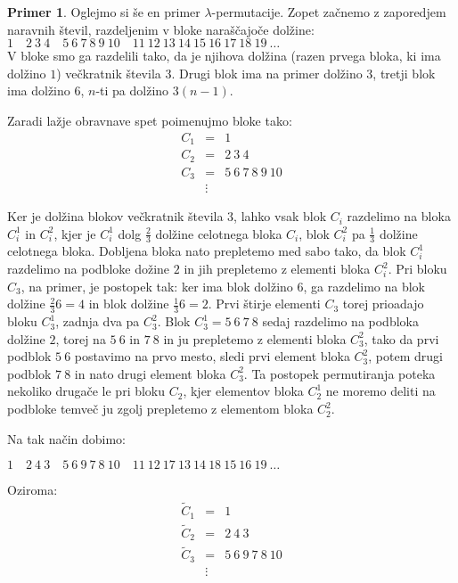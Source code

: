 \documentclass[12pt,a4paper,reqno]{amsart}
\theoremstyle{definition} %
\newtheorem{primer}[definicija]{Primer}
\theoremstyle{plain} %
\begin{document}
\begin{primer}
Oglejmo si še en primer $\lambda$-permutacije. Zopet začnemo z zaporedjem naravnih števil, razdeljenim v bloke naraščajoče dolžine:\\
$1 \quad 2\: 3\: 4\quad 5\: 6\: 7\: 8\: 9\: 10 \quad 11\: 12\: 13\: 14\: 15\: 16\:17\: 18\: 19\: \ldots $\\
V bloke smo ga razdelili tako, da je njihova dolžina (razen prvega bloka, ki ima dolžino $1$) večkratnik števila $3$. Drugi blok ima na primer dolžino $3$, tretji blok ima dolžino $6$, $n$-ti pa dolžino $3(n-1)$. 

Zaradi lažje obravnave spet poimenujmo bloke tako:
\begin{eqnarray*}
C_1&=& 1\\
C_2&=& 2\: 3\: 4\\
C_3&=& 5\: 6\: 7\: 8\: 9\: 10\\
&\vdots &
\end{eqnarray*}

Ker je dolžina blokov večkratnik števila $3$, lahko vsak blok $C_i$ razdelimo na bloka $C_i^1$ in $C_i^2$, kjer je $C_i^1$ dolg $\frac{2}{3}$ dolžine celotnega bloka $C_i$, blok $C_i^2$ pa $\frac{1}{3}$ dolžine celotnega bloka. Dobljena bloka nato prepletemo med sabo tako, da blok $C_i^1$ razdelimo na podbloke dožine $2$ in jih prepletemo z elementi bloka $C_i^2$. 
Pri bloku $C_3$, na primer, je postopek tak: ker ima blok dolžino $6$, ga razdelimo na blok dolžine $\frac{2}{3} 6=4$ in blok dolžine $\frac{1}{3} 6=2$. Prvi štirje elementi $C_3$ torej prioadajo bloku $C_3^1$, zadnja dva pa $C_3^2$. Blok $C_3^1 = 5\ 6\ 7\ 8$ sedaj razdelimo na podbloka dolžine $2$, torej na $5\ 6$ in $7\ 8$ in ju prepletemo z elementi bloka $C_3^2$, tako da prvi podblok $5\ 6$ postavimo na prvo mesto, sledi prvi element bloka $C_3^2$, potem drugi podblok $7\ 8$ in nato drugi element bloka $C_3^2$. Ta postopek permutiranja poteka nekoliko drugače le pri bloku $C_2$, kjer elementov bloka $C_2^1$ ne moremo deliti na podbloke temveč ju zgolj prepletemo z elementom bloka $C_2^2$.

Na tak način dobimo:

$1 \quad 2\: 4\: 3\quad 5\: 6\: 9\: 7\: 8\: 10 \quad 11\: 12\: 17\: 13\: 14\: 18\: 15\: 16\: 19\: \ldots $

Oziroma:
\begin{eqnarray*}
\tilde{C}_1&=& 1\\
\tilde{C}_2&=& 2\: 4\: 3\\
\tilde{C}_3&=& 5\: 6\: 9\: 7\: 8\: 10\\
&\vdots &
\end{eqnarray*}


\end{primer}
\end{document}
